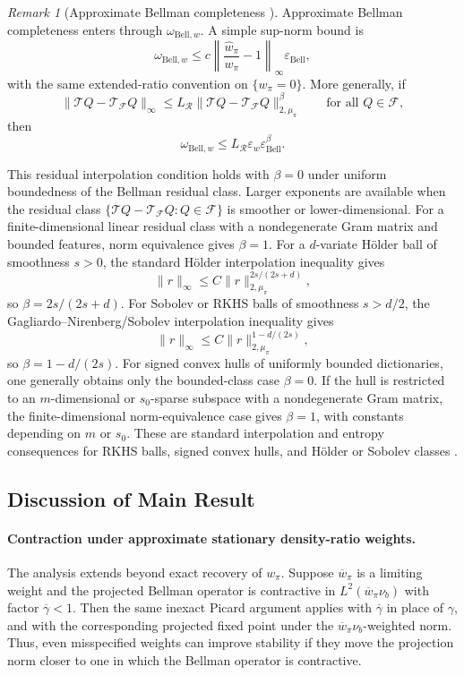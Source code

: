 \documentclass{article}
\theoremstyle{plain}
\theoremstyle{definition}
\theoremstyle{remark}
\newtheorem{remark}{Remark}
\begin{document}
\begin{remark}[Approximate Bellman completeness ]
Approximate Bellman completeness enters through
\(\omega_{\mathrm{Bell},w}\). A simple sup-norm bound is
\[
\omega_{\mathrm{Bell},w}
\le
c\left\|\frac{\widehat w_\pi}{w_\pi}-1\right\|_\infty
\varepsilon_{\mathrm{Bell}},
\]
with the same extended-ratio convention on \(\{w_\pi=0\}\). More generally, if
\[
\|\mathcal TQ-\mathcal T_{\mathcal F}Q\|_\infty
\le
L_{\mathcal R}
\|\mathcal TQ-\mathcal T_{\mathcal F}Q\|_{2,\mu_\pi}^{\beta}
\qquad\text{for all }Q\in\mathcal F,
\]
then
\[
\omega_{\mathrm{Bell},w}
\le
L_{\mathcal R}\varepsilon_w\varepsilon_{\mathrm{Bell}}^\beta .
\]

This residual interpolation condition holds with \(\beta=0\) under uniform
boundedness of the Bellman residual class. Larger exponents are available when
the residual class
\(\{\mathcal TQ-\mathcal T_{\mathcal F}Q:Q\in\mathcal F\}\) is smoother or
lower-dimensional. For a finite-dimensional linear residual class with a
nondegenerate Gram matrix and bounded features, norm equivalence gives
\(\beta=1\). For a \(d\)-variate Hölder ball of smoothness \(s>0\), the standard
Hölder interpolation inequality gives
\[
\|r\|_\infty
\le
C\|r\|_{2,\mu_\pi}^{2s/(2s+d)},
\]
so \(\beta=2s/(2s+d)\). For Sobolev or RKHS balls of smoothness \(s>d/2\), the
Gagliardo--Nirenberg/Sobolev interpolation inequality gives
\[
\|r\|_\infty
\le
C\|r\|_{2,\mu_\pi}^{1-d/(2s)},
\]
so \(\beta=1-d/(2s)\). For signed convex hulls of uniformly bounded
dictionaries, one generally obtains only the bounded-class case \(\beta=0\). If
the hull is restricted to an \(m\)-dimensional or \(s_0\)-sparse subspace with a
nondegenerate Gram matrix, the finite-dimensional norm-equivalence case gives
\(\beta=1\), with constants depending on \(m\) or \(s_0\). These are standard
interpolation and entropy consequences for RKHS balls, signed convex hulls, and
Hölder or Sobolev classes
\citep{mendelson2010regularization,van2014uniform,bibaut2021sequential,
adams2003sobolev,triebel2006theory}. 
\end{remark}




\subsection{Discussion of Main Result}
\label{app:approxwts}
\paragraph{Contraction under approximate stationary density-ratio weights.}
The analysis extends beyond exact recovery of \(w_\pi\). Suppose
\(\overline w_\pi\) is a limiting weight and the projected Bellman operator is
contractive in \(L^2(\overline w_\pi\nu_b)\) with factor
\(\overline\gamma<1\). Then the same inexact Picard argument applies with
\(\overline\gamma\) in place of \(\gamma\), and with the corresponding projected
fixed point under the \(\overline w_\pi\nu_b\)-weighted norm. Thus, even
misspecified weights can improve stability if they move the projection norm
closer to one in which the Bellman operator is contractive.
\end{document}
